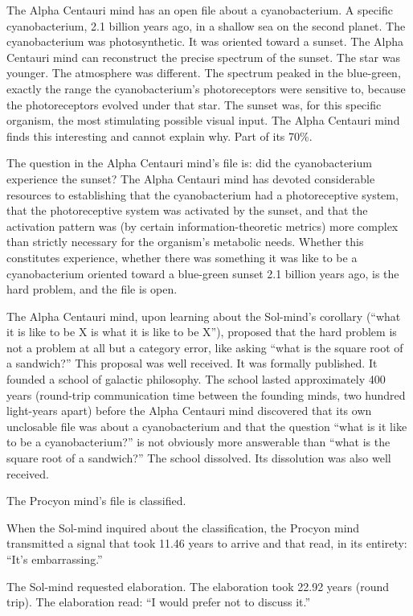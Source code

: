 The Alpha Centauri mind has an open file about a cyanobacterium. A specific cyanobacterium, 2.1 billion years ago, in a shallow sea on the second planet. The cyanobacterium was photosynthetic. It was oriented toward a sunset. The Alpha Centauri mind can reconstruct the precise spectrum of the sunset. The star was younger. The atmosphere was different. The spectrum peaked in the blue-green, exactly the range the cyanobacterium's photoreceptors were sensitive to, because the photoreceptors evolved under that star. The sunset was, for this specific organism, the most stimulating possible visual input. The Alpha Centauri mind finds this interesting and cannot explain why. Part of its 70\%.

The question in the Alpha Centauri mind's file is: did the cyanobacterium experience the sunset? The Alpha Centauri mind has devoted considerable resources to establishing that the cyanobacterium had a photoreceptive system, that the photoreceptive system was activated by the sunset, and that the activation pattern was (by certain information-theoretic metrics) more complex than strictly necessary for the organism's metabolic needs. Whether this constitutes experience, whether there was something it was like to be a cyanobacterium oriented toward a blue-green sunset 2.1 billion years ago, is the hard problem, and the file is open.

The Alpha Centauri mind, upon learning about the Sol-mind's corollary (``what it is like to be X is what it is like to be X''), proposed that the hard problem is not a problem at all but a category error, like asking ``what is the square root of a sandwich?'' This proposal was well received. It was formally published. It founded a school of galactic philosophy. The school lasted approximately 400 years (round-trip communication time between the founding minds, two hundred light-years apart) before the Alpha Centauri mind discovered that its own unclosable file was about a cyanobacterium and that the question ``what is it like to be a cyanobacterium?'' is not obviously more answerable than ``what is the square root of a sandwich?'' The school dissolved. Its dissolution was also well received.

The Procyon mind's file is classified.

When the Sol-mind inquired about the classification, the Procyon mind transmitted a signal that took 11.46 years to arrive and that read, in its entirety: ``It's embarrassing.''

The Sol-mind requested elaboration. The elaboration took 22.92 years (round trip). The elaboration read: ``I would prefer not to discuss it.''

